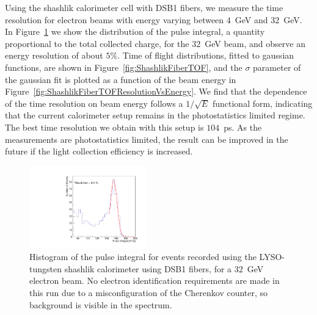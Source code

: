 \documentclass[12pt]{article}
\begin{document}
{Using the shashlik calorimeter cell with DSB1 fibers, we measure the time resolution
for electron beams with energy varying between $4$~GeV and $32$~GeV.
In Figure~\ref{fig:ShashlikFiberEnergy32GeV} we show the distribution
of the pulse integral, a quantity proportional to the total collected charge,
for the $32$~GeV beam, and observe an energy resolution of about $5\%$.
Time of flight distributions, fitted to gaussian functions,
are shown in Figure~\ref{fig:ShashlikFiberTOF}, and the 
$\sigma$ parameter of the gaussian fit is plotted as a function of the
beam energy in Figure~\ref{fig:ShashlikFiberTOFResolutionVsEnergy}.
We find that the dependence of the time resolution on
beam energy follows a $1/\sqrt{E}$ functional form, indicating
that the current calorimeter setup remains in the photostatistics
limited regime. The best time resolution we obtain
with this setup is $104$~ps. As the measurements are photostatistics
limited, the result can be improved in the future if the light collection
efficiency is increased.

\begin{figure}[H] \centering
\includegraphics[width=0.45\textwidth]{figs/TOF_ShashlikDSB1Fiber_Electron_32GeV_energy} 
\caption{ Histogram of the pulse integral for events recorded using
the LYSO-tungsten shashlik calorimeter using DSB1 fibers, for 
a $32$~GeV electron beam. No electron identification requirements
are made in this run due to a misconfiguration of the Cherenkov counter,
so background is visible in the spectrum. } 
\label{fig:ShashlikFiberEnergy32GeV}
\end{figure}

}
\end{document}
